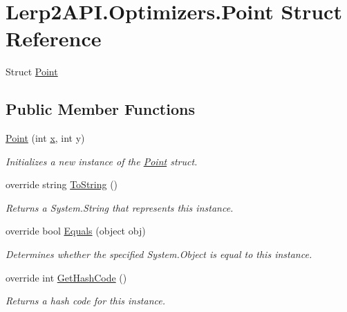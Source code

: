 \hypertarget{struct_lerp2_a_p_i_1_1_optimizers_1_1_point}{}\section{Lerp2\+A\+P\+I.\+Optimizers.\+Point Struct Reference}
\label{struct_lerp2_a_p_i_1_1_optimizers_1_1_point}


Struct \hyperlink{struct_lerp2_a_p_i_1_1_optimizers_1_1_point}{Point}  


\subsection*{Public Member Functions}
\begin{DoxyCompactItemize}
\item 
\hyperlink{struct_lerp2_a_p_i_1_1_optimizers_1_1_point_acbc8b93890fbb765ae1d9cab6027068e}{Point} (int \hyperlink{struct_lerp2_a_p_i_1_1_optimizers_1_1_point_a43880eb415c1aa7d86bcd1bc7d4951ee}{x}, int y)
\begin{DoxyCompactList}\small\item\em Initializes a new instance of the \hyperlink{struct_lerp2_a_p_i_1_1_optimizers_1_1_point}{Point} struct. \end{DoxyCompactList}\item 
override string \hyperlink{struct_lerp2_a_p_i_1_1_optimizers_1_1_point_a9e5608f09142f6e9ed1c8f29d0c7b78e}{To\+String} ()
\begin{DoxyCompactList}\small\item\em Returns a System.\+String that represents this instance. \end{DoxyCompactList}\item 
override bool \hyperlink{struct_lerp2_a_p_i_1_1_optimizers_1_1_point_a869dfe6b92fa685d7688724359a53160}{Equals} (object obj)
\begin{DoxyCompactList}\small\item\em Determines whether the specified System.\+Object is equal to this instance. \end{DoxyCompactList}\item 
override int \hyperlink{struct_lerp2_a_p_i_1_1_optimizers_1_1_point_a591668a0f9a19a0c1bc1ee86894d07cf}{Get\+Hash\+Code} ()
\begin{DoxyCompactList}\small\item\em Returns a hash code for this instance. \end{DoxyCompactList}\item 

\end{DoxyCompactItemize}

